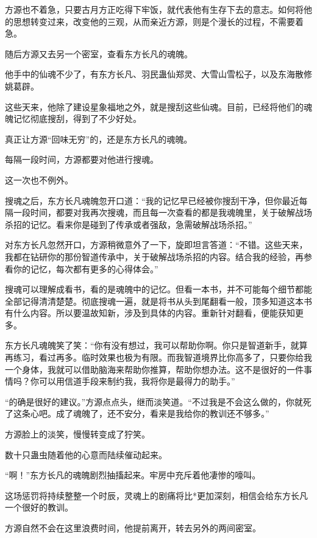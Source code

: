 
\begin{this_body}

方源也不着急，只要古月方正吃得下牢饭，就代表他有生存下去的意志。如何将他的思想转变过来，改变他的三观，从而亲近方源，则是个漫长的过程，不需要着急。

随后方源又去另一个密室，查看东方长凡的魂魄。

他手中的仙魂不少了，有东方长凡、羽民蛊仙郑灵、大雪山雪松子，以及东海散修姚葛辟。

这些天来，他除了建设星象福地之外，就是搜刮这些仙魂。目前，已经将他们的魂魄记忆彻底搜刮，得到了不少好处。

真正让方源“回味无穷”的，还是东方长凡的魂魄。

每隔一段时间，方源都要对他进行搜魂。

这一次也不例外。

搜魂之后，东方长凡魂魄忽开口道：“我的记忆早已经被你搜刮干净，但你最近每隔一段时间，都要对我再次搜魂，而且每一次查看的都是我魂魄里，关于破解战场杀招的记忆。看来你是碰到了传承或者强敌，急需破解战场杀招。”

对东方长凡忽然开口，方源稍微意外了一下，旋即坦言答道：“不错。这些天来，我都在钻研你的那份智道传承中，关于破解战场杀招的内容。结合我的经验，再参看你的记忆，每次都有更多的心得体会。”

搜魂可以理解成看书，看的是魂魄中的记忆。但看一本书，并不可能每个细节都能全部记得清清楚楚。彻底搜魂一遍，就是将书从头到尾翻看一般，顶多知道这本书有什么内容。所以要温故知新，涉及到具体的内容。重新针对翻看，便能获知更多。

东方长凡魂魄笑了笑：“你有没有想过，我可以帮助你啊。你只是智道新手，就算再练习，看过再多。临时效果也极为有限。而我智道境界比你高多了，只要你给我一个身体，我就可以借助脑海来帮助你推算，帮助你想办法。这不是很好的一件事情吗？你可以用信道手段来制约我，我将你是最得力的助手。”

“的确是很好的建议。”方源点点头，继而淡笑道。“不过我是不会这么做的，你就死了这条心吧。成了魂魄了，还不安分，看来是我给你的教训还不够多。”

方源脸上的淡笑，慢慢转变成了狞笑。

数十只蛊虫随着他的心意而陆续催动起来。

“啊！”东方长凡的魂魄剧烈抽搐起来。牢房中充斥着他凄惨的嚎叫。

这场惩罚将持续整整一个时辰，灵魂上的剧痛将比*更加深刻，相信会给东方长凡一个很好的教训。

方源自然不会在这里浪费时间，他提前离开，转去另外的两间密室。


\end{this_body}
